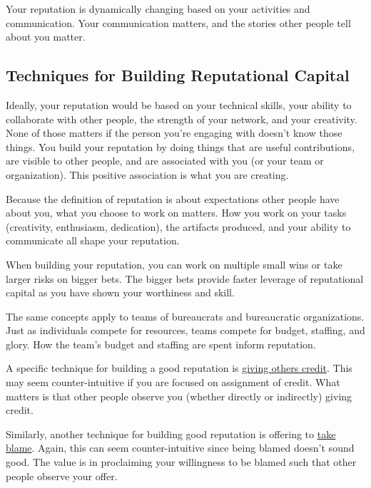 Your reputation is dynamically changing based on your activities and communication. Your communication matters, and the stories other people tell about you matter.

\subsection*{Techniques for Building Reputational Capital}

Ideally, your reputation would be based on your technical skills, your ability to collaborate with other people, the strength of your network, and your creativity. None of those matters if the person you're engaging with doesn't know those things. 
You build your reputation by doing things that are useful contributions, are visible to other people, and are associated with you (or your team or organization). This positive association is what you are creating.

Because the definition of reputation is about expectations other people have about you, what you choose to work on matters. How you work on your tasks (creativity, enthusiasm, dedication), the artifacts produced, and your ability to communicate all shape your reputation. 

When building your reputation, you can work on multiple small wins or take larger risks on bigger bets. The bigger bets provide faster leverage of reputational capital as you have shown your worthiness and skill. 

The same concepts apply to teams of bureaucrats and bureaucratic organizations. Just as individuals compete for resources, teams compete for budget, staffing, and glory. How the team's budget and staffing are spent inform reputation. 

A specific technique for building a good reputation is 
\hyperref[sec:credit-others]{giving others credit}. 
%
%
This may seem counter-intuitive if you are focused on assignment of credit. What  matters is that other people observe you (whether directly or indirectly) giving credit. 

Similarly, another technique for building good reputation is offering to \hyperref[sec:take-blame]{take blame}.
%
%
Again, this can seem counter-intuitive since being blamed doesn't sound good. The value is in proclaiming your willingness to be blamed such that other people observe your offer. 

